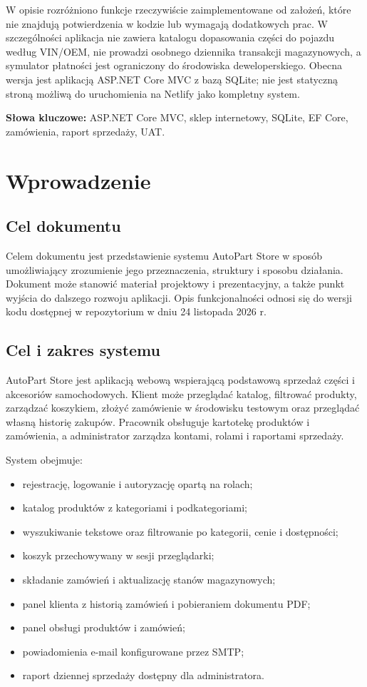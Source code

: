 \documentclass[12pt,a4paper]{article}
\begin{document}
W opisie rozróżniono funkcje rzeczywiście zaimplementowane od założeń, które nie
znajdują potwierdzenia w kodzie lub wymagają dodatkowych prac. W szczególności
aplikacja nie zawiera katalogu dopasowania części do pojazdu według VIN/OEM,
nie prowadzi osobnego dziennika transakcji magazynowych, a symulator płatności
jest ograniczony do środowiska deweloperskiego. Obecna wersja jest aplikacją
ASP.NET Core MVC z bazą SQLite; nie jest statyczną stroną możliwą do uruchomienia
na Netlify jako kompletny system.

\textbf{Słowa kluczowe:} ASP.NET Core MVC, sklep internetowy, SQLite, EF Core,
zamówienia, raport sprzedaży, UAT.

\section{Wprowadzenie}

\subsection{Cel dokumentu}
Celem dokumentu jest przedstawienie systemu AutoPart Store w sposób umożliwiający
zrozumienie jego przeznaczenia, struktury i sposobu działania. Dokument może
stanowić materiał projektowy i prezentacyjny, a także punkt wyjścia do dalszego
rozwoju aplikacji. Opis funkcjonalności odnosi się do wersji kodu dostępnej
w repozytorium w dniu 24 listopada 2026 r.

\subsection{Cel i zakres systemu}
AutoPart Store jest aplikacją webową wspierającą podstawową sprzedaż części
i akcesoriów samochodowych. Klient może przeglądać katalog, filtrować produkty,
zarządzać koszykiem, złożyć zamówienie w środowisku testowym oraz przeglądać
własną historię zakupów. Pracownik obsługuje kartotekę produktów i zamówienia,
a administrator zarządza kontami, rolami i raportami sprzedaży.

System obejmuje:
\begin{itemize}[leftmargin=*]
    \item rejestrację, logowanie i autoryzację opartą na rolach;
    \item katalog produktów z kategoriami i podkategoriami;
    \item wyszukiwanie tekstowe oraz filtrowanie po kategorii, cenie i dostępności;
    \item koszyk przechowywany w sesji przeglądarki;
    \item składanie zamówień i aktualizację stanów magazynowych;
    \item panel klienta z historią zamówień i pobieraniem dokumentu PDF;
    \item panel obsługi produktów i zamówień;
    \item powiadomienia e-mail konfigurowane przez SMTP;
    \item raport dziennej sprzedaży dostępny dla administratora.
\end{itemize}
\end{document}
